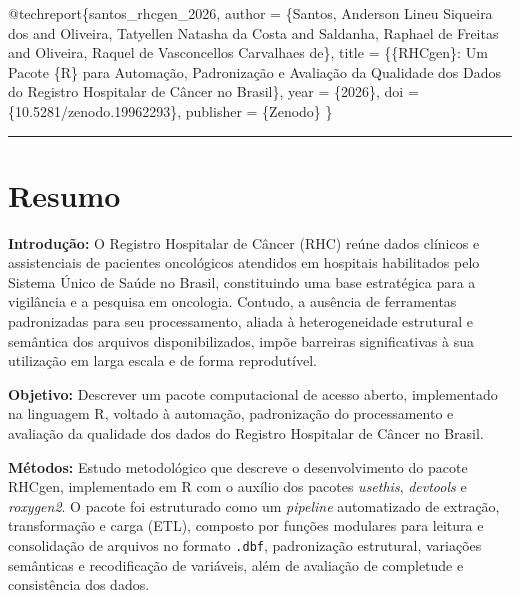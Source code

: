 \documentclass[
  brazilian,
  a4paper,
  oneside]{scrbook}
\newenvironment{Shaded}{\begin{snugshade}}{\end{snugshade}}
\newcommand{\DataTypeTok}[1]{\textcolor[rgb]{0.68,0.00,0.00}{#1}}
\newcommand{\NormalTok}[1]{\textcolor[rgb]{0.00,0.23,0.31}{#1}}
\newcommand{\OtherTok}[1]{\textcolor[rgb]{0.00,0.23,0.31}{#1}}
\newcommand{\VariableTok}[1]{\textcolor[rgb]{0.07,0.07,0.07}{#1}}
\begin{document}
\begin{Shaded}
\begin{Highlighting}[]
\VariableTok{@techreport}\NormalTok{\{}\OtherTok{santos\_rhcgen\_2026}\NormalTok{,}
  \DataTypeTok{author}\NormalTok{    = \{Santos, Anderson Lineu Siqueira dos and}
\NormalTok{               Oliveira, Tatyellen Natasha da Costa and}
\NormalTok{               Saldanha, Raphael de Freitas and}
\NormalTok{               Oliveira, Raquel de Vasconcellos Carvalhaes de\},}
  \DataTypeTok{title}\NormalTok{     = \{\{RHCgen\}: Um Pacote \{R\} para Automação, Padronização e}
\NormalTok{               Avaliação da Qualidade dos Dados do Registro Hospitalar}
\NormalTok{               de Câncer no Brasil\},}
  \DataTypeTok{year}\NormalTok{      = \{2026\},}
  \DataTypeTok{doi}\NormalTok{       = \{10.5281/zenodo.19962293\},}
  \DataTypeTok{publisher}\NormalTok{ = \{Zenodo\}}
\NormalTok{\}}
\end{Highlighting}
\end{Shaded}

\begin{center}\rule{0.5\linewidth}{0.5pt}\end{center}

\section*{Resumo}\label{resumo}


\textbf{Introdução:} O Registro Hospitalar de Câncer (RHC) reúne dados
clínicos e assistenciais de pacientes oncológicos atendidos em hospitais
habilitados pelo Sistema Único de Saúde no Brasil, constituindo uma base
estratégica para a vigilância e a pesquisa em oncologia. Contudo, a
ausência de ferramentas padronizadas para seu processamento, aliada à
heterogeneidade estrutural e semântica dos arquivos disponibilizados,
impõe barreiras significativas à sua utilização em larga escala e de
forma reprodutível.

\textbf{Objetivo:} Descrever um pacote computacional de acesso aberto,
implementado na linguagem R, voltado à automação, padronização do
processamento e avaliação da qualidade dos dados do Registro Hospitalar
de Câncer no Brasil.

\textbf{Métodos:} Estudo metodológico que descreve o desenvolvimento do
pacote RHCgen, implementado em R com o auxílio dos pacotes
\emph{usethis}, \emph{devtools} e \emph{roxygen2}. O pacote foi
estruturado como um \emph{pipeline} automatizado de extração,
transformação e carga (ETL), composto por funções modulares para leitura
e consolidação de arquivos no formato \texttt{.dbf}, padronização
estrutural, variações semânticas e recodificação de variáveis, além de
avaliação de completude e consistência dos dados.
\end{document}
